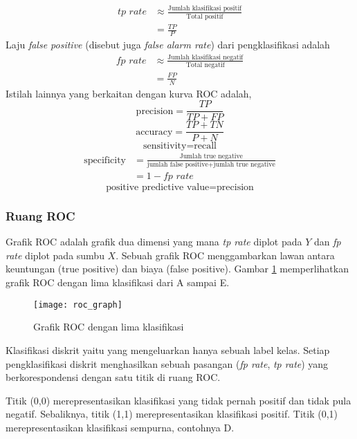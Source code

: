 \begin{align*}
	\textit{tp rate} &\approx
			\frac{\text{Jumlah klasifikasi positif}}
				{\text{Total positif}} \\
		&= \frac{TP}{P}
\end{align*}
Laju \textit{false positive} (disebut juga \textit{false alarm rate}) dari
pengklasifikasi adalah
\begin{align*}
	\textit{fp rate} &\approx \frac{\text{Jumlah klasifikasi negatif}}
			{\text{Total negatif}} \\
		&= \frac{FP}{N}
\end{align*}
Istilah lainnya yang berkaitan dengan kurva ROC adalah,
\[
	\text{precision} = \frac{TP}{TP + FP}
\]
\[
	\text{accuracy} = \frac{TP + TN}{P + N}
\]
\[
	\text{sensitivity} = \text{recall}
\]
\begin{align*}
	\text{specificity}
		&= \frac{\text{Jumlah true negative}}
			{\text{jumlah false positive}
			+ \text{jumlah true negative}} \\
		&= 1 - \textit{fp rate}
\end{align*}
\[
	\text{positive predictive value} = \text{precision}
\]

\subsubsection{Ruang ROC}

Grafik ROC adalah grafik dua dimensi yang mana \textit{tp rate} diplot pada
$ Y $ dan \textit{fp rate} diplot pada sumbu $ X $.
Sebuah grafik ROC menggambarkan lawan antara keuntungan (true positive) dan
biaya (false positive).
Gambar \ref{fig:roc_graph} memperlihatkan grafik ROC dengan lima klasifikasi
dari A sampai E.

\begin{figure}[t!]
	\centering
	\texttt{[image: roc\_graph]}
	\caption{Grafik ROC dengan lima klasifikasi}
	\label{fig:roc_graph}
\end{figure}

Klasifikasi diskrit yaitu yang mengeluarkan hanya sebuah label kelas.
Setiap pengklasifikasi diskrit menghasilkan sebuah pasangan
(\textit{fp rate}, \textit{tp rate}) yang berkorespondensi dengan satu titik di
ruang ROC.

Titik (0,0) merepresentasikan klasifikasi yang tidak pernah positif dan tidak
pula negatif. Sebaliknya, titik (1,1) merepresentasikan klasifikasi positif.
Titik (0,1) merepresentasikan klasifikasi sempurna, contohnya D.


